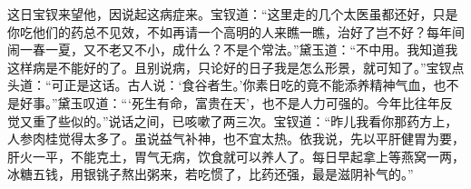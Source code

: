 \begin{parag}


    这日宝钗来望他，因说起这病症来。宝钗道：“这里走的几个太医虽都还好，只是你吃他们的药总不见效，不如再请一个高明的人来瞧一瞧，治好了岂不好？每年间闹一春一夏，又不老又不小，成什么？不是个常法。”黛玉道：“不中用。我知道我这样病是不能好的了。且别说病，只论好的日子我是怎么形景，就可知了。”宝钗点头道：“可正是这话。古人说：‘食谷者生。’你素日吃的竟不能添养精神气血，也不是好事。”黛玉叹道：“‘死生有命，富贵在天’，也不是人力可强的。今年比往年反觉又重了些似的。”说话之间，已咳嗽了两三次。宝钗道：“昨儿我看你那药方上，人参肉桂觉得太多了。虽说益气补神，也不宜太热。依我说，先以平肝健胃为要，肝火一平，不能克土，胃气无病，饮食就可以养人了。每日早起拿上等燕窝一两，冰糖五钱，用银铫子熬出粥来，若吃惯了，比药还强，最是滋阴补气的。”
\end{parag}


